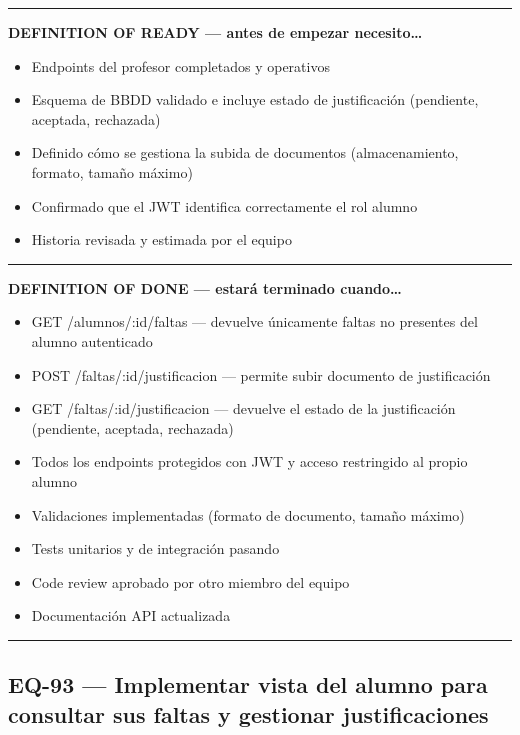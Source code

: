 \documentclass[
  spanish,
  11pt,
]{report}
\providecommand{\tightlist}{%
  \setlength{\itemsep}{0pt}\setlength{\parskip}{0pt}}
\begin{document}
\begin{center}\rule{0.5\linewidth}{0.5pt}\end{center}

\textbf{DEFINITION OF READY --- antes de empezar necesito\ldots{}}

\begin{itemize}
\tightlist
\item
  Endpoints del profesor completados y operativos
\item
  Esquema de BBDD validado e incluye estado de justificación (pendiente,
  aceptada, rechazada)
\item
  Definido cómo se gestiona la subida de documentos (almacenamiento,
  formato, tamaño máximo)
\item
  Confirmado que el JWT identifica correctamente el rol alumno
\item
  Historia revisada y estimada por el equipo
\end{itemize}

\begin{center}\rule{0.5\linewidth}{0.5pt}\end{center}

\textbf{DEFINITION OF DONE --- estará terminado cuando\ldots{}}

\begin{itemize}
\tightlist
\item
  GET /alumnos/:id/faltas --- devuelve únicamente faltas no presentes
  del alumno autenticado
\item
  POST /faltas/:id/justificacion --- permite subir documento de
  justificación
\item
  GET /faltas/:id/justificacion --- devuelve el estado de la
  justificación (pendiente, aceptada, rechazada)
\item
  Todos los endpoints protegidos con JWT y acceso restringido al propio
  alumno
\item
  Validaciones implementadas (formato de documento, tamaño máximo)
\item
  Tests unitarios y de integración pasando
\item
  Code review aprobado por otro miembro del equipo
\item
  Documentación API actualizada
\end{itemize}

\begin{center}\rule{0.5\linewidth}{0.5pt}\end{center}

\subsection{EQ-93 --- Implementar vista del alumno para consultar sus
faltas y gestionar
justificaciones}\label{eq-93-implementar-vista-del-alumno-para-consultar-sus-faltas-y-gestionar-justificaciones}
\end{document}
